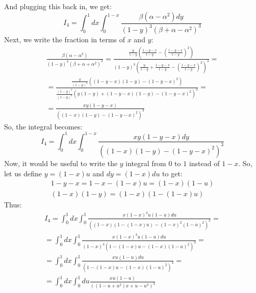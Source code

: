 \documentclass{article}
\begin{document}
And plugging this back in, we get:
\begin{equation}
    I_4 = \int_0^1 dx \int_0^{1-x} \frac{\beta\left(\alpha - \alpha^2\right)dy}{(1 - y)^3(\beta + \alpha - \alpha^2)^3}
\end{equation}
Next, we write the fraction in terms of $x$ and $y$:
\begin{equation}
\begin{gathered}
    \frac{\beta\left(\alpha - \alpha^2\right)}{(1 - y)^3(\beta + \alpha + \alpha^2)^3} = 
    \frac{\frac{y}{1 - y}\left(\frac{1 - y - x}{1 - y} - \left(\frac{1 - y - x}{1 - y}\right)^2\right)}{(1 - y)^3\left(\frac{y}{1 - y} + \frac{1 - y - x}{1 - y} - \left(\frac{1 - y - x}{1 - y}\right)^2\right)^3} = \\ =
    \frac{\frac{y}{(1 - y)^3}\left((1 - y - x)(1 - y) - (1 - y - x)^2\right)}{\frac{(1 - y)^3}{(1 - y)^6}\left(y(1 - y) + (1 - y - x)(1 - y) - (1 - y - x)^2\right)^3} = \\ =
    \frac{xy(1 - y - x)}{\left((1 - x)(1 - y) - (1 - y - x)^2\right)^3}
\end{gathered}
\end{equation}
So, the integral becomes:
\begin{equation}
    I_4 = \int_0^1 dx \int_0^{1-x} \frac{xy(1 - y - x)dy}{\left((1 - x)(1 - y) - (1 - y - x)^2\right)^3}
\end{equation}
Now, it would be useful to write the $y$ integral from $0$ to $1$ instead of $1 - x$. So, let us define $y = (1 - x)u$ and $dy = (1 - x)du$ to get:
\begin{equation}
\begin{gathered}
    1 - y - x = 1 - x - (1 - x)u = (1 - x)(1 - u)
    \\
    (1 - x)(1 - y) = (1 - x)(1 - (1 - x)u)
\end{gathered}
\end{equation}
Thus:
\begin{equation}
\begin{gathered}
    I_4 = \int_0^1 dx \int_0^{1} \frac{x(1 - x)^3u(1 - u)du}{\left((1 - x)(1 - (1 - x)u) - (1 - x)^2(1 - u)^2\right)^3} = \\ =
    \int_0^1 dx \int_0^{1} \frac{x(1 - x)^3u(1 - u)du}{(1 - x)^3\left(1 - (1 - x)u - (1 - x)(1 - u)^2\right)^3} = \\ =
    \int_0^1 dx \int_0^{1} \frac{xu(1 - u)du}{\left(1 - (1 - x)u - (1 - x)(1 - u)^2\right)^3} = \\ =
    \int_0^1 dx \int_0^{1} du \frac{xu(1 - u)}{\left((1 - u + u^2)x + u - u^2\right)^3}
\end{gathered}
\end{equation}
\end{document}

